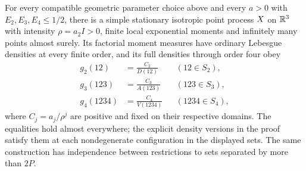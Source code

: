 \begin{theorem}
\label{thm:main}
For every compatible geometric parameter choice above and every $a>0$ with $E_2,E_3,E_4\leq1/2$, there is a simple stationary isotropic point process $X$ on $\mathbb R^3$ with intensity $\rho=a_2I>0$, finite local exponential moments and infinitely many points almost surely. Its factorial moment measures have ordinary Lebesgue densities at every finite order, and its full densities through order four obey
\begin{align*}
 g_2(12)&=\frac{C_2}{D(12)} && (12\in S_2),\\
 g_3(123)&=\frac{C_3}{A(123)} && (123\in S_3),\\
 g_4(1234)&=\frac{C_4}{V(1234)} && (1234\in S_4),
\end{align*}
where $C_j=a_j/\rho^j$ are positive and fixed on their respective domains. The equalities hold almost everywhere; the explicit density versions in the proof satisfy them at each nondegenerate configuration in the displayed sets. The same construction has independence between restrictions to sets separated by more than $2P$.
\end{theorem}

